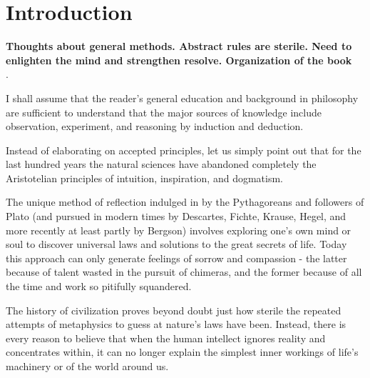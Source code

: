 \documentclass{article}
\newcommand{\boldline}[1]{%
 \vspace{\baselineskip}%
 \noindent\textbf{#1}\\[0.5\baselineskip]%
}
\begin{document}
\begin{comment}
Despite the haste with which this fourth edition was revised, I have as usual introduced several modifications that seemed useful to me. I removed what seemed overly florid or ill-conceived; I honed certain passages where the style was tired, thick, or incorrect; and finally, I further developed several chapters by enriching them with new examples or pertinent observations.

I sincerely believe that this edition, more than the others, merits the unusual attention it has received from the new generation, along with the endorsement of certain illustrious scientists, for whose good will I am grateful.

\begin{flushright} Madrid, December 6, 1916 \end{flushright} 
\end{comment}

\newpage\section{Introduction}

\boldline{Thoughts about general methods. Abstract rules are sterile. Need to enlighten the mind and strengthen resolve. Organization of the book}.

I shall assume that the reader’s general education and background in philosophy are sufficient to understand that the major sources of knowledge include observation, experiment, and reasoning by induction and deduction.

Instead of elaborating on accepted principles, let us simply point out that for the last hundred years the natural sciences have abandoned completely the Aristotelian principles of intuition, inspiration, and dogmatism.

The unique method of reflection indulged in by the Pythagoreans and followers of Plato (and pursued in modern times by Descartes, Fichte, Krause, Hegel, and more recently at least partly by Bergson) involves exploring one’s own mind or soul to discover universal laws and solutions to the great secrets of life. Today this approach can only generate feelings of sorrow and compassion - the latter because of talent wasted in the pursuit of chimeras, and the former because of all the time and work so pitifully squandered.

The history of civilization proves beyond doubt just how sterile the repeated attempts of metaphysics to guess at nature’s laws have been. Instead, there is every reason to believe that when the human intellect ignores reality and concentrates within, it can no longer explain the simplest inner workings of life’s machinery or of the world around us.
\end{document}

